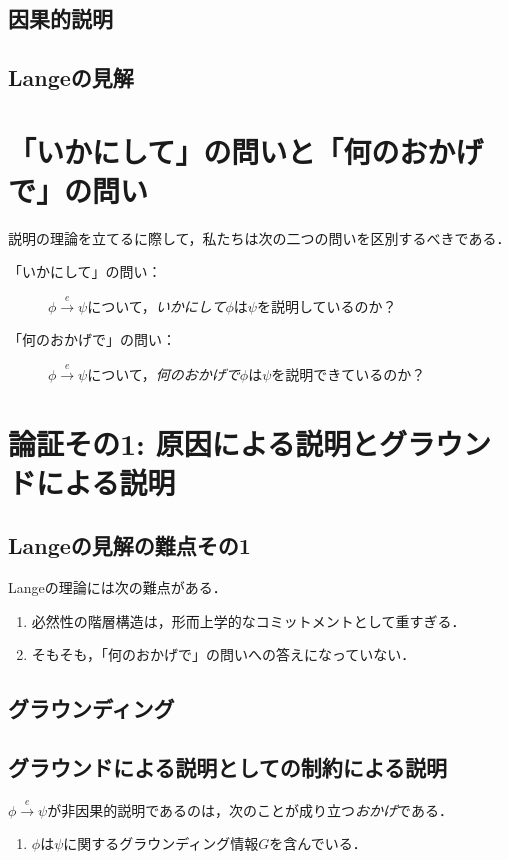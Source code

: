 \documentclass[twoside,12pt,uplatex]{jsarticle}
\theoremstyle{definition}
\begin{document}
\subsection{因果的説明}
\subsection{Langeの見解}

\section{「いかにして」の問いと「何のおかげで」の問い}\label{howandwhat}
説明の理論を立てるに際して，私たちは次の二つの問いを区別するべきである．
	\begin{description}
	\item[「いかにして」の問い：]$\phi\xrightarrow{e}\psi$について，\emph{いかにして}$\phi$は$\psi$を説明しているのか？
	\item[「何のおかげで」の問い：]$\phi\xrightarrow{e}\psi$について，\emph{何のおかげで}$\phi$は$\psi$を説明できているのか？
	\end{description}


\section{論証その1: 原因による説明とグラウンドによる説明}\label{firstargument}

\subsection{Langeの見解の難点その1}
Langeの理論には次の難点がある．
	\begin{enumerate}
	\item 必然性の階層構造は，形而上学的なコミットメントとして重すぎる．
	\item そもそも，「何のおかげで」の問いへの答えになっていない．
	\end{enumerate}

\subsection{グラウンディング}

\subsection{グラウンドによる説明としての制約による説明}
$\phi\xrightarrow{e}\psi$が非因果的説明であるのは，次のことが成り立つ\emph{おかげ}である．
	\begin{enumerate}
	\item $\phi$は$\psi$に関するグラウンディング情報$G$を含んでいる．
	\end{enumerate}
\end{document}
